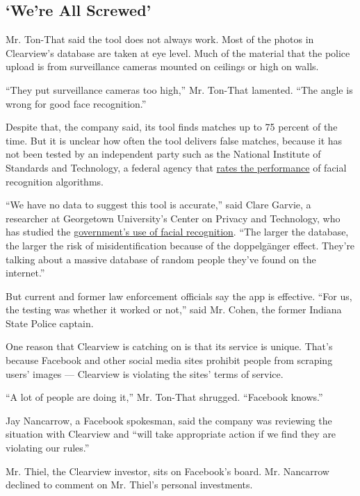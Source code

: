 \hypertarget{were-all-screwed}{%
\subsection{`We're All Screwed'}\label{were-all-screwed}}

Mr. Ton-That said the tool does not always work. Most of the photos in
Clearview's database are taken at eye level. Much of the material that
the police upload is from surveillance cameras mounted on ceilings or
high on walls.

``They put surveillance cameras too high,'' Mr. Ton-That lamented. ``The
angle is wrong for good face recognition.''

Despite that, the company said, its tool finds matches up to 75 percent
of the time. But it is unclear how often the tool delivers false
matches, because it has not been tested by an independent party such as
the National Institute of Standards and Technology, a federal agency
that
\href{https://www.nist.gov/programs-projects/face-recognition-vendor-test-frvt-ongoing}{rates
the performance} of facial recognition algorithms.

``We have no data to suggest this tool is accurate,'' said Clare Garvie,
a researcher at Georgetown University's Center on Privacy and
Technology, who has studied the
\href{https://www.flawedfacedata.com/}{government's use of facial
recognition}. ``The larger the database, the larger the risk of
misidentification because of the doppelgänger effect. They're talking
about a massive database of random people they've found on the
internet.''

But current and former law enforcement officials say the app is
effective. ``For us, the testing was whether it worked or not,'' said
Mr. Cohen, the former Indiana State Police captain.

One reason that Clearview is catching on is that its service is unique.
That's because Facebook and other social media sites prohibit people
from scraping users' images --- Clearview is violating the sites' terms
of service.

``A lot of people are doing it,'' Mr. Ton-That shrugged. ``Facebook
knows.''

Jay Nancarrow, a Facebook spokesman, said the company was reviewing the
situation with Clearview and ``will take appropriate action if we find
they are violating our rules.''

Mr. Thiel, the Clearview investor, sits on Facebook's board. Mr.
Nancarrow declined to comment on Mr. Thiel's personal investments.

